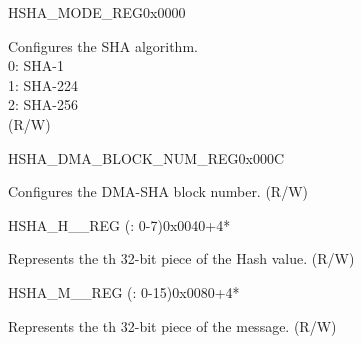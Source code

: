 \begin{register}{H}{SHA\_MODE\_REG}{0x0000}\label{regdesc:SHAMODEREG}
%
%
\regnewline%
\begin{regdesc}\begin{reglist}
\label{fielddesc:SHAMODE}\item [SHA\_MODE] Configures the SHA algorithm. \\
0: SHA-1\\
1: SHA-224\\
2: SHA-256\\
(R/W)
\end{reglist}\end{regdesc}
\end{register}



\begin{register}{H}{SHA\_DMA\_BLOCK\_NUM\_REG}{0x000C}\label{regdesc:SHADMABLOCKNUMREG}
%
%
\regnewline%
\begin{regdesc}\begin{reglist}
\label{fielddesc:SHADMABLOCKNUM}\item [SHA\_DMA\_BLOCK\_NUM] Configures the DMA-SHA block number. (R/W)
\end{reglist}\end{regdesc}
\end{register}

\begin{register}{H}{SHA\_H\_\_REG (: 0-7)}{0x0040+4*}\label{regdesc:SHAHNREG}
%
\regnewline%
\begin{regdesc}\begin{reglist}
\label{fielddesc:SHAH0}\item [SHA\_H\_\regindex{n}] Represents the th 32-bit piece of the Hash value. (R/W)
\end{reglist}\end{regdesc}
\end{register}

\begin{register}{H}{SHA\_M\_\_REG (: 0-15)}{0x0080+4*}\label{regdesc:SHAMNREG}
%
\regnewline%
\begin{regdesc}\begin{reglist}
\label{fielddesc:SHAM0}\item [SHA\_M\_\regindex{n}] Represents the th 32-bit piece of the message. (R/W)
\end{reglist}\end{regdesc}
\end{register}
